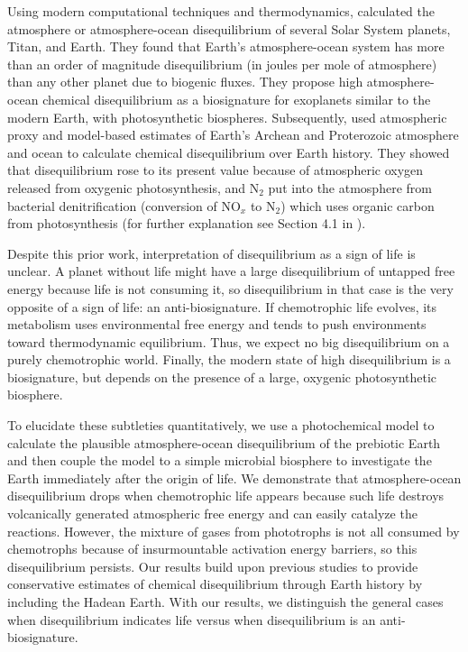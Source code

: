 Using modern computational techniques and thermodynamics, \citet{KrissansenTotton_2016} calculated the atmosphere or atmosphere-ocean disequilibrium of several Solar System planets, Titan, and Earth. They found that Earth's atmosphere-ocean system has more than an order of magnitude disequilibrium (in joules per mole of atmosphere) than any other planet due to biogenic fluxes. They propose high atmosphere-ocean chemical disequilibrium as a biosignature for exoplanets similar to the modern Earth, with photosynthetic biospheres. Subsequently, \citet{KrissansenTotton_2018c} used atmospheric proxy and model-based estimates of Earth's Archean and Proterozoic atmosphere and ocean to calculate chemical disequilibrium over Earth history. They showed that disequilibrium rose to its present value because of atmospheric oxygen released from oxygenic photosynthesis, and N$_2$ put into the atmosphere from bacterial denitrification (conversion of NO$_x$ to N$_2$) which uses organic carbon from photosynthesis (for further explanation see Section 4.1 in \citet{KrissansenTotton_2016}).

Despite this prior work, interpretation of disequilibrium as a sign of life is unclear. A planet without life might have a large disequilibrium of untapped free energy because life is not consuming it, so disequilibrium in that case is the very opposite of a sign of life: an anti-biosignature. If chemotrophic life evolves, its metabolism uses environmental free energy and tends to push environments toward thermodynamic equilibrium. Thus, we expect no big disequilibrium on a purely chemotrophic world. Finally, the modern state of high disequilibrium is a biosignature, but depends on the presence of a large, oxygenic photosynthetic biosphere.

To elucidate these subtleties quantitatively, we use a photochemical model to calculate the plausible atmosphere-ocean disequilibrium of the prebiotic Earth and then couple the model to a simple microbial biosphere to investigate the Earth immediately after the origin of life. We demonstrate that atmosphere-ocean disequilibrium drops when chemotrophic life appears because such life destroys volcanically generated atmospheric free energy and can easily catalyze the reactions. However, the mixture of gases from phototrophs is not all consumed by chemotrophs because of insurmountable activation energy barriers, so this disequilibrium persists. Our results build upon previous studies \citep{KrissansenTotton_2016,KrissansenTotton_2018c} to provide conservative estimates of chemical disequilibrium through Earth history by including the Hadean Earth. With our results, we distinguish the general cases when disequilibrium indicates life versus when disequilibrium is an anti-biosignature. 

